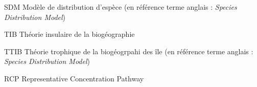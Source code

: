 %
%
%
%
%


\tabledesmatieres






\listeabrev
\begin{liste}

\item[SDM] Modèle de distribution d'espèce (en référence terme anglais : \textit{Species Distribution Model})

\item[TIB] Théorie insulaire de la biogéographie

\item[TTIB] Théorie trophique de la biogéogrpahi des île (en référence terme anglais : \textit{Species Distribution Model})

\item[RCP]  Representative Concentration Pathway
\end{liste}

